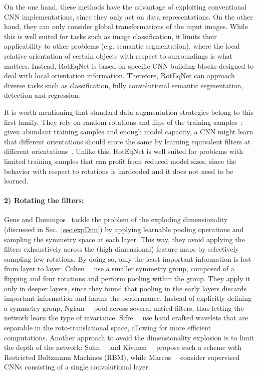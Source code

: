 \documentclass[10pt,twocolumn,letterpaper,table]{article}
\begin{document}
On the one hand, these methods have the advantage of exploiting conventional CNN implementations, since they only act on data representations. On the other hand, they can only consider global transformations of the input images. While this is well suited for tasks such as image classification, it limits their applicability to other problems (e.g. semantic segmentation), where the local relative orientation of certain objects with respect to surroundings is what matters. Instead, RotEqNet is based on specific CNN building blocks designed to deal with local orientation information. Therefore, RotEqNet can approach diverse tasks such as classification, fully convolutional semantic segmentation, detection and regression.

It is worth mentioning that standard data augmentation strategies belong to this first family. They rely on random rotations and flips of the training samples~\cite{simard2003best}: given abundant training samples and enough model capacity, a CNN might learn that different orientations should score the same by learning equivalent filters at different orientations~\cite{lenc2015understanding}. Unlike this, RotEqNet is well suited for problems with limited training samples that can profit from reduced model sizes, since the behavior with respect to rotations is hardcoded and it does not need to be learned.

\vspace*{-3mm}
\paragraph{2) Rotating the filters:}
Gens and Domingos~\cite{gens2014deep} tackle the problem of the exploding dimensionality (discussed in Sec.~\ref{sec:expDim}) by applying learnable pooling operations and sampling the symmetry space at each layer. This way, they avoid applying the filters exhaustively across the (high dimensional) feature maps by selectively sampling few rotations. By doing so, only the least important information is lost from layer to layer.  Cohen~\etal~\cite{cohen2016group,cohen2016steerable} use a smaller symmetry group, composed of a flipping and four  rotations and perform pooling within the group. They apply it only in deeper layers, since they found that pooling in the early layers discards important information and harms the performance. 
Instead of explicitly defining a symmetry group, Ngiam~\etal~\cite{ngiam2010tiled} pool across several untied filters, thus letting the network learn the type of invariance. Sifre~\etal~\cite{sifre2013rotation} use hand crafted wavelets that are separable in the roto-translational space, allowing for more efficient computations. 
Another approach to avoid the dimensionality explosion is to limit the depth of the network: Sohn~\etal~\cite{sohn2012learning} and Kivinen~\etal~\cite{kivinen2011transformation} propose such a scheme with Restricted Boltzmann Machines (RBM), while Marcos~\etal~\cite{marcos2016learning} consider supervised CNNs consisting of a single convolutional layer.
	
\end{document}
